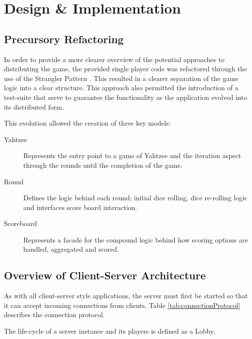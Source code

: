 \section{Design \& Implementation}
\subsection{Precursory Refactoring}

In order to provide a more clearer overview of the potential approaches to distributing the game, the provided single player code was refactored through the use of the Strangler Pattern \parencite{strangler2004}. This resulted in a clearer separation of the game logic into a clear structure. This approach also permitted the introduction of a test-suite that serve to guarantee the functionality as the application evolved into its distributed form.

This evolution allowed the creation of three key models: 

\begin{description}
	\item [Yahtzee]  Represents the entry point to a game of Yahtzee and the iteration aspect through the rounds until the completion of the game.
	\item [Round] Defines the logic behind each round; initial dice rolling, dice re-rolling logic and interfaces score board interaction.
	\item [Scoreboard] Represents a facade for the compound logic behind how scoring options are handled, aggregated and scored.
\end{description}

\subsection{Overview of Client-Server Architecture}

As with all client-server style applications, the server must first be started so that it can accept incoming connections from clients. Table \ref{tab:connectionProtocol} describes the connection protocol.

The life-cycle of a server instance and its players is defined as a Lobby. 

